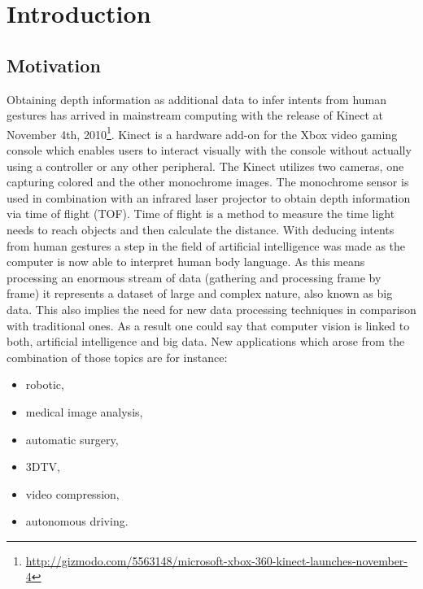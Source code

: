 \chapter{Introduction}
\label{chap:introduction}

\section{Motivation}

Obtaining depth information as additional data to infer intents from human gestures has arrived in mainstream computing with the release of Kinect at November 4th, 2010\footnote{\url{http://gizmodo.com/5563148/microsoft-xbox-360-kinect-launches-november-4}}.
Kinect is a hardware add-on for the Xbox video gaming console which enables users to interact visually with the console without actually using a controller or any other peripheral.
The Kinect utilizes two cameras, one capturing colored and the other monochrome images.
The monochrome sensor is used in combination with an infrared laser projector to obtain depth information via time of flight (TOF).
Time of flight is a method to measure the time light needs to reach objects and then calculate the distance.
\newline\newline\noindent With deducing  intents from human gestures a step in the field of artificial intelligence was made as the computer is now able to interpret human body language.
As this means processing an enormous stream of data (gathering and processing frame by frame) it represents a dataset of large and complex nature, also known as big data.
This also implies the need for new data processing techniques in comparison with traditional ones.
As a result one could say that computer vision is linked to both, artificial intelligence and big data.
New applications which arose from the combination of those topics are for instance:

\begin{itemize}
  \item robotic,
  \item medical image analysis,
  \item automatic surgery,
  \item 3DTV,
  \item video compression,
  \item autonomous driving.
\end{itemize}

